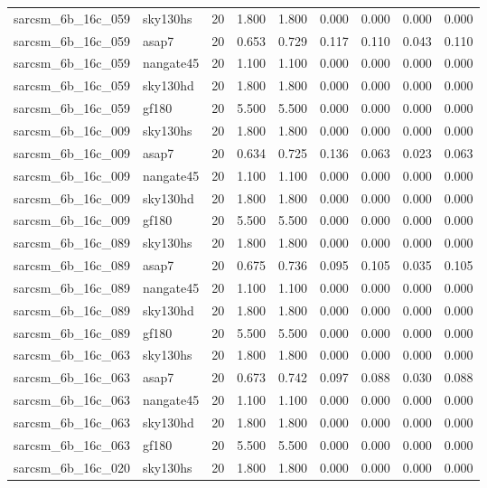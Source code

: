 \begin{tabular}{llrrrrrrr}
sarcsm\_6b\_16c\_059 & sky130hs & 20 & 1.800 & 1.800 & 0.000 & 0.000 & 0.000 & 0.000 \\
sarcsm\_6b\_16c\_059 & asap7 & 20 & 0.653 & 0.729 & 0.117 & 0.110 & 0.043 & 0.110 \\
sarcsm\_6b\_16c\_059 & nangate45 & 20 & 1.100 & 1.100 & 0.000 & 0.000 & 0.000 & 0.000 \\
sarcsm\_6b\_16c\_059 & sky130hd & 20 & 1.800 & 1.800 & 0.000 & 0.000 & 0.000 & 0.000 \\
sarcsm\_6b\_16c\_059 & gf180 & 20 & 5.500 & 5.500 & 0.000 & 0.000 & 0.000 & 0.000 \\
sarcsm\_6b\_16c\_009 & sky130hs & 20 & 1.800 & 1.800 & 0.000 & 0.000 & 0.000 & 0.000 \\
sarcsm\_6b\_16c\_009 & asap7 & 20 & 0.634 & 0.725 & 0.136 & 0.063 & 0.023 & 0.063 \\
sarcsm\_6b\_16c\_009 & nangate45 & 20 & 1.100 & 1.100 & 0.000 & 0.000 & 0.000 & 0.000 \\
sarcsm\_6b\_16c\_009 & sky130hd & 20 & 1.800 & 1.800 & 0.000 & 0.000 & 0.000 & 0.000 \\
sarcsm\_6b\_16c\_009 & gf180 & 20 & 5.500 & 5.500 & 0.000 & 0.000 & 0.000 & 0.000 \\
sarcsm\_6b\_16c\_089 & sky130hs & 20 & 1.800 & 1.800 & 0.000 & 0.000 & 0.000 & 0.000 \\
sarcsm\_6b\_16c\_089 & asap7 & 20 & 0.675 & 0.736 & 0.095 & 0.105 & 0.035 & 0.105 \\
sarcsm\_6b\_16c\_089 & nangate45 & 20 & 1.100 & 1.100 & 0.000 & 0.000 & 0.000 & 0.000 \\
sarcsm\_6b\_16c\_089 & sky130hd & 20 & 1.800 & 1.800 & 0.000 & 0.000 & 0.000 & 0.000 \\
sarcsm\_6b\_16c\_089 & gf180 & 20 & 5.500 & 5.500 & 0.000 & 0.000 & 0.000 & 0.000 \\
sarcsm\_6b\_16c\_063 & sky130hs & 20 & 1.800 & 1.800 & 0.000 & 0.000 & 0.000 & 0.000 \\
sarcsm\_6b\_16c\_063 & asap7 & 20 & 0.673 & 0.742 & 0.097 & 0.088 & 0.030 & 0.088 \\
sarcsm\_6b\_16c\_063 & nangate45 & 20 & 1.100 & 1.100 & 0.000 & 0.000 & 0.000 & 0.000 \\
sarcsm\_6b\_16c\_063 & sky130hd & 20 & 1.800 & 1.800 & 0.000 & 0.000 & 0.000 & 0.000 \\
sarcsm\_6b\_16c\_063 & gf180 & 20 & 5.500 & 5.500 & 0.000 & 0.000 & 0.000 & 0.000 \\
sarcsm\_6b\_16c\_020 & sky130hs & 20 & 1.800 & 1.800 & 0.000 & 0.000 & 0.000 & 0.000 \\

\end{tabular}

